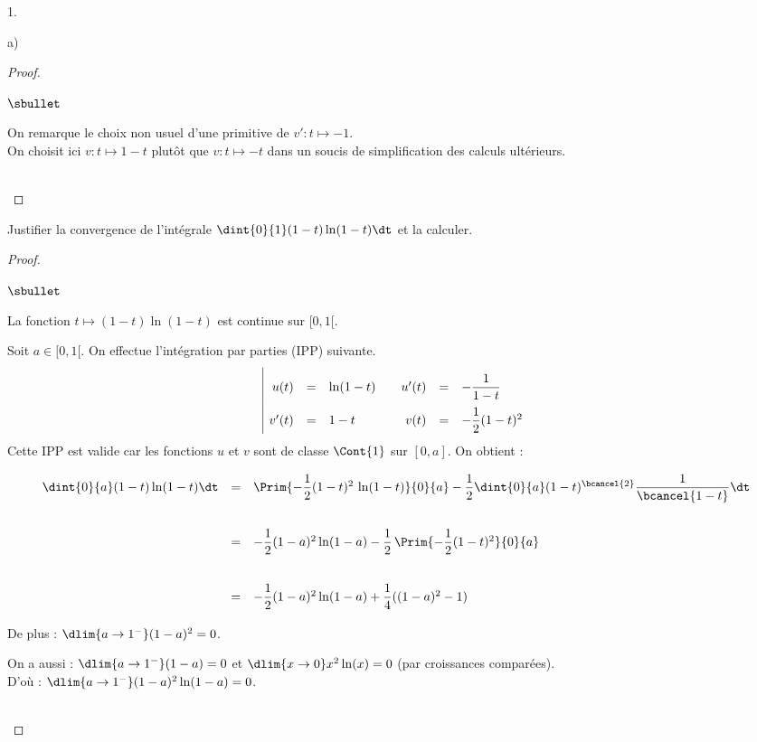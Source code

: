 \documentclass[11pt]{article}%
\begin{document}
\begin{noliste}{1.}
\begin{noliste}{a)}
\begin{proof}
\begin{remark}
\begin{noliste}{$\sbullet$}
      \item On remarque le choix non usuel d'une primitive de 
      $v':t \mapsto -1$.\\
      On choisit ici $v:t \mapsto 1-t$ plutôt que $v:t \mapsto -t$ 
      dans un soucis de simplification des calculs ultérieurs.
    \end{noliste}
    \end{remark}~\\[-1.4cm]
  \end{proof}
  
  
  
  \newpage
  

  
  \item Justifier la convergence de l'intégrale $\dint{0}{1} 
  (1-t)\ln(1-t) \dt$ et la calculer. 
  
  \begin{proof}~
    \begin{noliste}{$\sbullet$}
      \item La fonction $t\mapsto (1-t) \ln(1-t)$ est continue 
      sur $[0,1[$.
      \item Soit $a\in [0,1[$. On effectue l'intégration par parties 
      (IPP) suivante.
      \[
	\renewcommand{\arraystretch}{2.2}
	\begin{array}{|rcl@{\qquad}rcl}
	  u(t) & = & \ln(1-t) & u'(t) & = & - \dfrac{1}{1-t} \\
	  v'(t) & = & 1-t & v(t) & = & -\dfrac{1}{2}(1-t)^2
	\end{array}
      \]
      Cette IPP est valide car les fonctions $u$ et $v$ sont de classe 
      $\Cont{1}$ sur $[0,a]$. On obtient :
      \[
        \begin{array}{rcl}
          \dint{0}{a} (1-t) \ln(1-t) \dt &=& \Prim{-\dfrac{1}{2}
          (1-t)^2 \, \ln(1-t)}{0}{a} - \dfrac{1}{2} \dint{0}{a} 
          (1-t)^{\bcancel{2}} \dfrac{1}{\bcancel{1-t}} \dt
          \\[.6cm]
          &=& - \dfrac{1}{2} (1-a)^2 \ln(1-a) - \dfrac{1}{2} 
          \, \Prim{-\dfrac{1}{2}(1-t)^2}{0}{a}
          \\[.6cm]
          &=& - \dfrac{1}{2}(1-a)^2 \ln(1-a) + \dfrac{1}{4}((1-a)^2
          -1)
        \end{array}
      \]
    
      \item De plus : $\dlim{a \to 1^-} (1-a)^2=0$.
      \item On a aussi : $\dlim{a\to 1^-} (1-a)=0$ et 
      $\dlim{x\to 0} x^2\ln(x)=0$ (par croissances comparées).\\[.1cm]
      D'où : $\dlim{a\to 1^-} (1-a)^2 \ln(1-a)=0$.
    \end{noliste}
    ~\\[-1cm]
  \end{proof}
  

\end{noliste}
\end{noliste}
\end{document}
